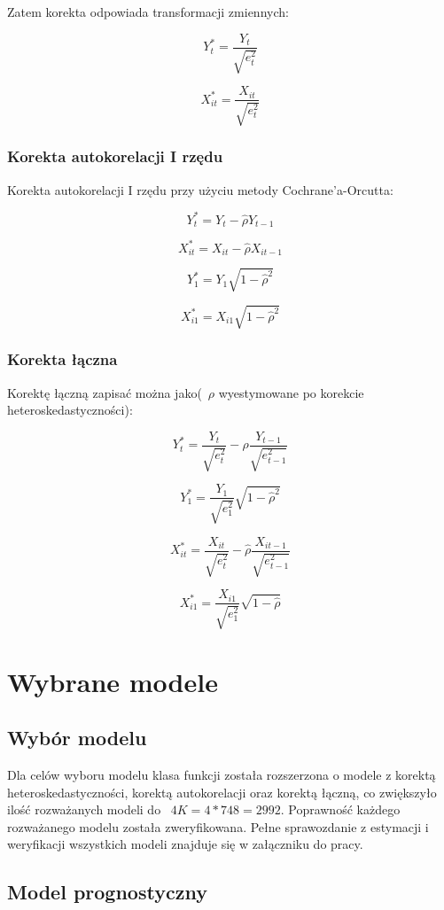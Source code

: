 \documentclass{article}
\begin{document}
Zatem korekta odpowiada transformacji zmiennych:

\[Y_t^* = \frac{Y_t}{\sqrt{e_t^2}}\]

\[X_{it}^* = \frac{X_{it}}{\sqrt{e_t^2}}\]

\newpage
\subsubsection{Korekta autokorelacji I rzędu}
Korekta autokorelacji I rzędu przy użyciu metody Cochrane'a-Orcutta:

\[Y_t^* = Y_t - \hat{\rho}Y_{t-1}\]

\[X_{it}^* = X_{it} - \hat{\rho}X_{it-1}\]

\[Y_1^* = Y_1\sqrt{1-\hat{\rho}^2}\]

\[X_{i1}^* = X_{i1}\sqrt{1 - \hat{\rho}^2}\]

\subsubsection{Korekta łączna}
Korektę łączną zapisać można jako(~$\rho$ wyestymowane po korekcie heteroskedastyczności):

\[Y_t^* = \frac{Y_t}{\sqrt{e_t^2}} - \hat{\rho}\frac{Y_{t-1}}{\sqrt{e_{t-1}^2}}\]

\[Y_1^* = \frac{Y_1}{\sqrt{e_1^2}}\sqrt{1-\hat{\rho}^2}\]

\[X_{it}^* = \frac{X_{it}}{\sqrt{e_t^2}} - \hat{\rho}\frac{X_{it-1}}{\sqrt{e_{t-1}^2}}\]

\[X_{i1}^* = \frac{X_{i1}}{\sqrt{e_1^2}}\sqrt{1-\hat{\rho}}\]

\newpage
\section{Wybrane modele}
\subsection{Wybór modelu}
Dla celów wyboru modelu klasa funkcji została rozszerzona o modele z korektą heteroskedastyczności, korektą autokorelacji oraz korektą łączną, co zwiększyło ilość rozważanych modeli do ~$4K=4*748=2992$. Poprawność każdego rozważanego modelu została zweryfikowana. Pełne sprawozdanie z estymacji i weryfikacji wszystkich modeli znajduje się w załączniku do pracy.

\subsection{Model prognostyczny}
\end{document}
